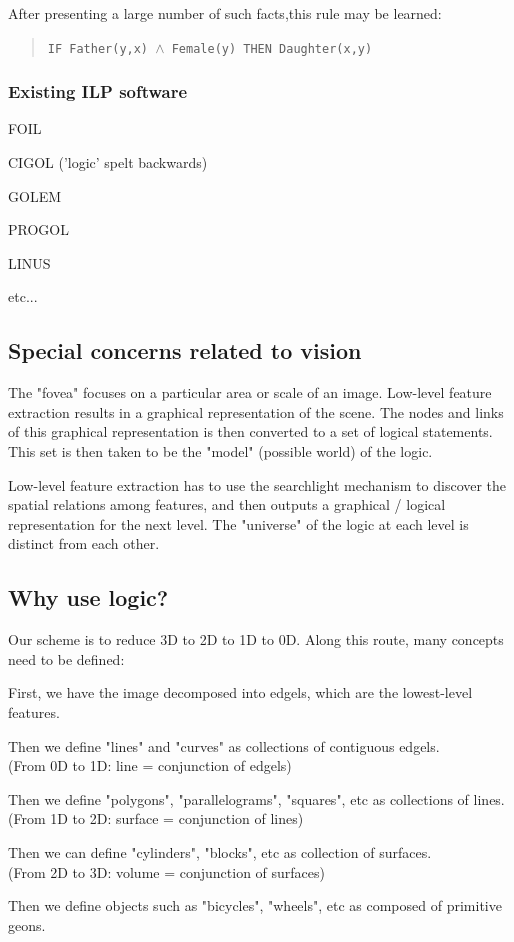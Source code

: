 After presenting a large number of such facts,this rule may be learned:
\begin{quote}

\texttt{IF Father(y,x) $\wedge$ Female(y) THEN Daughter(x,y)}
\end{quote}

\subsubsection{Existing ILP software}
\begin{compactenum-}
	\item FOIL
	\item  CIGOL ('logic' spelt backwards)
	\item GOLEM
	\item  PROGOL
	\item LINUS
	\item etc...
\end{compactenum-}

\subsection{Special concerns related to vision}

The "fovea" focuses on a particular area or scale of an image. Low-level feature extraction results in a graphical representation of the scene. The nodes and links of this graphical representation is then converted to a set of logical statements. This set is then taken to be the "model" (possible world) of the logic.

Low-level feature extraction has to use the searchlight mechanism to discover the spatial relations among features, and then outputs a graphical / logical representation for the next level. The "universe" of the logic at each level is distinct from each other.

\subsection{Why use logic?}

 Our scheme is to reduce 3D to 2D to 1D to 0D. Along this route, many concepts need to be defined:
\begin{compactenum-}
	\item  First, we have the image decomposed into edgels, which are the lowest-level features.
	\item  Then we define "lines" and "curves" as collections of contiguous edgels.
\\
    (From 0D to 1D: line = conjunction of edgels)
	\item  Then we define "polygons", "parallelograms", "squares", etc as collections of lines.
\\
    (From 1D to 2D: surface = conjunction of lines) 
	\item  Then we can define "cylinders", "blocks", etc as collection of surfaces.
\\
    (From 2D to 3D: volume = conjunction of surfaces)
	\item Then we define objects such as "bicycles", "wheels", etc as composed of primitive geons.
\end{compactenum-}


